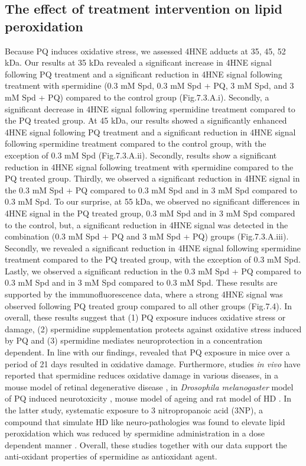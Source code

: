 \subsection{The effect of treatment intervention on lipid peroxidation}
Because PQ induces oxidative stress, we assessed 4HNE adducts at 35, 45, 52 kDa. Our results at 35 kDa revealed a significant increase in 4HNE signal following PQ treatment and a significant reduction in 4HNE signal following treatment with spermidine (0.3 mM Spd, 0.3 mM Spd + PQ, 3 mM Spd, and 3 mM Spd + PQ) compared to the control group (Fig.7.3.A.i). Secondly, a significant decrease in 4HNE signal following spermidine treatment compared to the PQ treated group. At 45 kDa, our results showed a significantly enhanced 4HNE signal following PQ treatment and a significant reduction in 4HNE signal following spermidine treatment compared to the control group, with the exception of 0.3 mM Spd (Fig.7.3.A.ii). Secondly, results show a significant reduction in 4HNE signal following treatment with spermidine compared to the PQ treated group. Thirdly, we observed a significant reduction in 4HNE signal in the 0.3 mM Spd + PQ compared to 0.3 mM Spd and in 3 mM Spd compared to 0.3 mM Spd. To our surprise, at 55 kDa, we observed no significant differences in 4HNE signal in the PQ treated group, 0.3 mM Spd and in 3 mM Spd compared to the control, but, a significant reduction in 4HNE signal was detected in the combination (0.3 mM Spd + PQ and 3 mM Spd + PQ) groups (Fig.7.3.A.iii). Secondly, we revealed a significant reduction in 4HNE signal following spermidine treatment compared to the PQ treated group, with the exception of 0.3 mM Spd. Lastly, we observed a significant reduction in the 0.3 mM Spd + PQ compared to 0.3 mM Spd and in 3 mM Spd compared to 0.3 mM Spd. These results are supported by the immunofluorescence data, where a strong 4HNE signal was observed following PQ treated group compared to all other groups (Fig.7.4). In overall, these results suggest that (1) PQ exposure induces oxidative stress or damage, (2) spermidine supplementation protects against oxidative stress induced by PQ and (3) spermidine mediates neuroprotection in a concentration dependent. In line with our findings, \citet{Chen2012} revealed that PQ exposure in mice over a period of 21 days resulted in oxidative damage. Furthermore, studies \textit{in vivo} have reported that spermidine reduces oxidative damage in various diseases, in a mouse model of retinal degenerative disease \citep{Noro2015}, in \textit{Drosophila melanogaster} model of PQ induced neurotoxicity \citep{Minois2012}, mouse model of ageing \citep{Eisenberg2009} and rat model of HD \citep{Jamwal2016}. In the latter study, systematic exposure to 3 nitropropanoic acid (3NP), a compound that simulate HD like neuro-pathologies was found to elevate lipid peroxidation which was reduced by spermidine administration in a dose dependent manner \citep{Jamwal2016}. Overall, these studies together with our data support the anti-oxidant properties of spermidine as antioxidant agent. 
